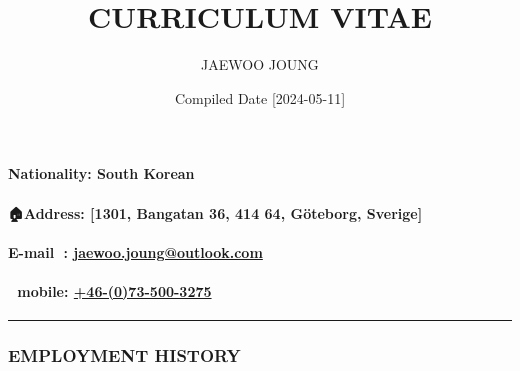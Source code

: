 \documentclass[12pt,a4paper]{article}
\title{ CURRICULUM VITAE }
\author{ JAEWOO JOUNG }
\date{ Compiled Date [2024-05-11] }
\begin{document}
\maketitle

\paragraph{Nationality: South Korean}
\paragraph{🏠Address: [1301, Bangatan 36, 414 64, Göteborg, Sverige]}
\paragraph{E-mail 📨: \href{mailto:jaewoo.joung@outlook.com}{jaewoo.joung@outlook.com}}
\paragraph{📲 mobile:  \href{+46-(0)73-500-3275}{+46-(0)73-500-3275}}
\rule{\textwidth}{1pt}
\subsubsection{EMPLOYMENT HISTORY}
\end{document}
